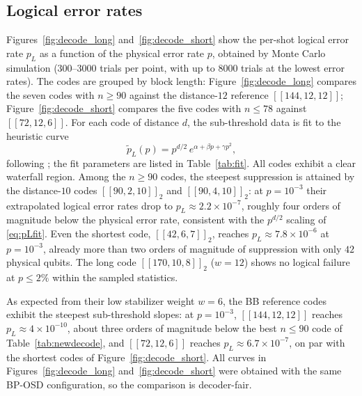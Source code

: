 \documentclass[journal,onecolumn]{IEEEtran}
\theoremstyle{definition}
\theoremstyle{remark}
\begin{document}
\subsection{Logical error rates}
Figures~\ref{fig:decode_long} and~\ref{fig:decode_short} show the
per-shot logical error rate $p_L$ as a function of the physical error
rate $p$, obtained by Monte Carlo simulation ($300$--$3000$ trials per
point, with up to $8000$ trials at the lowest error rates). The codes
are grouped by block length: Figure~\ref{fig:decode_long} compares the
seven codes with $n\ge 90$ against the distance-$12$ reference
$[[144,12,12]]$; Figure~\ref{fig:decode_short} compares the five codes
with $n\le 78$ against $[[72,12,6]]$. For each code of distance $d$, the
sub-threshold data is fit to the heuristic curve
\begin{equation}\label{eq:pLfit}
\tilde p_L(p)=p^{d/2}\, e^{\alpha+\beta p+\gamma p^2},
\end{equation}
following \cite{BB24,ITB}; the fit parameters are listed in
Table~\ref{tab:fit}. All codes exhibit a clear waterfall region. Among
the $n\ge 90$ codes, the steepest suppression is attained by the
distance-$10$ codes $[[90,2,10]]_2$ and $[[90,4,10]]_2$: at $p=10^{-3}$
their extrapolated logical error rates drop to $p_L\approx
2.2\times10^{-7}$, roughly four orders of magnitude below the physical
error rate, consistent with the $p^{d/2}$ scaling of \eqref{eq:pLfit}.
Even the shortest code, $[[42,6,7]]_2$, reaches $p_L\approx
7.8\times10^{-6}$ at $p=10^{-3}$, already more than two orders of
magnitude of suppression with only $42$ physical qubits. The long code
$[[170,10,8]]_2$ ($w=12$) shows no logical failure at $p\le 2\%$ within
the sampled statistics.

As expected from their low stabilizer weight $w=6$, the BB reference
codes exhibit the steepest sub-threshold slopes: at $p=10^{-3}$,
$[[144,12,12]]$ reaches $p_L\approx 4\times10^{-10}$, about three orders
of magnitude below the best $n\le 90$ code of
Table~\ref{tab:newdecode}, and $[[72,12,6]]$ reaches $p_L\approx
6.7\times10^{-7}$, on par with the shortest codes of
Figure~\ref{fig:decode_short}. All curves in
Figures~\ref{fig:decode_long} and~\ref{fig:decode_short} were obtained
with the same BP-OSD configuration, so the comparison is decoder-fair.
\end{document}
